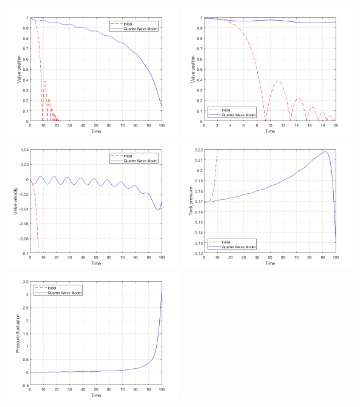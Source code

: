 \begin{figure}[!ht]
    \centering
    \includegraphics[width=0.4\textwidth]{Figures/QWMSimulation/NearEquilibriumOscillations/Position.png}
    \includegraphics[width=0.4\textwidth]{Figures/QWMSimulation/NearEquilibriumOscillations/Position-Short.png}
    \includegraphics[width=0.4\textwidth]{Figures/QWMSimulation/NearEquilibriumOscillations/Velocity.png}
    \includegraphics[width=0.4\textwidth]{Figures/QWMSimulation/NearEquilibriumOscillations/Pressure.png}
    \includegraphics[width=0.4\textwidth]{Figures/QWMSimulation/NearEquilibriumOscillations/B.png}

\end{figure}
